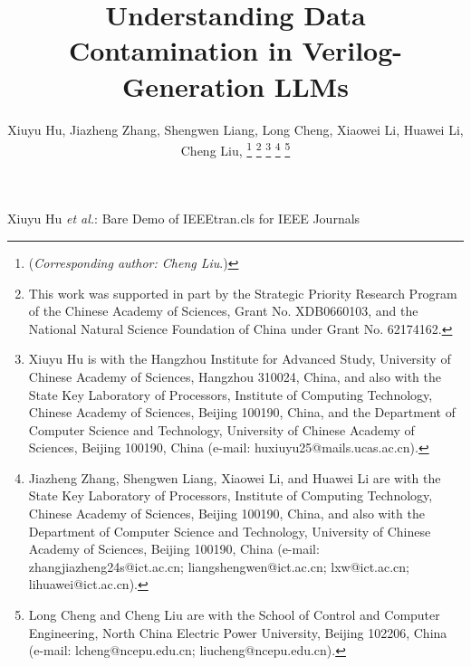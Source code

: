 \documentclass[journal]{IEEEtran}
\begin{document}
\title{Understanding Data Contamination in Verilog-Generation LLMs}

\author{Xiuyu Hu, 
        Jiazheng Zhang,
        Shengwen Liang,
        Long Cheng, 
        Xiaowei Li, 
        Huawei Li, 
        Cheng Liu, 
\thanks{(\textit{Corresponding author: Cheng Liu}.)}
\thanks{This work was supported in part by the Strategic Priority Research Program of the Chinese Academy of Sciences, Grant No. XDB0660103, and the National Natural Science Foundation of China under Grant No. 62174162.}
\thanks{Xiuyu Hu is with the Hangzhou Institute for Advanced Study, University of Chinese Academy of Sciences, Hangzhou 310024, China, and also with the State Key Laboratory of Processors, Institute of Computing Technology, Chinese Academy of Sciences, Beijing 100190, China, and the Department of Computer Science and Technology, University of Chinese Academy of Sciences, Beijing 100190, China (e-mail: huxiuyu25@mails.ucas.ac.cn).}
\thanks{Jiazheng Zhang, Shengwen Liang, Xiaowei Li, and Huawei Li are with the State Key Laboratory of Processors, Institute of Computing Technology, Chinese Academy of Sciences, Beijing 100190, China, and also with the Department of Computer Science and Technology, University of Chinese Academy of Sciences, Beijing 100190, China (e-mail: zhangjiazheng24s@ict.ac.cn; liangshengwen@ict.ac.cn; lxw@ict.ac.cn; lihuawei@ict.ac.cn).}
\thanks{Long Cheng and Cheng Liu are with the School of Control and Computer Engineering, North China Electric Power University, Beijing 102206, China (e-mail: lcheng@ncepu.edu.cn; liucheng@ncepu.edu.cn).}
}

%
{Xiuyu Hu  \MakeLowercase{\textit{et al.}}: Bare Demo of IEEEtran.cls for IEEE Journals}

\maketitle
\end{document}
